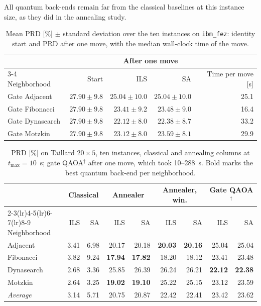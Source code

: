 \documentclass{svproc}
\newcommand{\rev}[1]{{\color{blue}#1}}
\newcommand{\rev}[1]{#1}
\begin{document}
All quantum back-ends remain far from the classical baselines at this instance
size, as they did in the annealing study.

\begin{table}[htb]
\centering
\caption{\rev{Mean PRD [\%] $\pm$ standard deviation over the ten instances on
  \texttt{ibm\_fez}: identity start and PRD after one move, with the median
  wall-clock time of the move.}}
\label{tab:rpd_hw}
\footnotesize
\begin{tabular*}{\textwidth}{@{\extracolsep{\fill}}lrrrr@{}}
\toprule
& & \multicolumn{2}{c}{\rev{After one move}} & \\
\cmidrule(lr){3-4}
\rev{Neighborhood} & \rev{Start} & \rev{ILS} & \rev{SA} & \rev{Time per move [s]} \\
\midrule
\rev{Gate Adjacent}   & \rev{$27.90\pm9.8$} & \rev{$25.04\pm10.0$} & \rev{$25.04\pm10.0$} & \rev{25.1} \\
\rev{Gate Fibonacci}  & \rev{$27.90\pm9.8$} & \rev{$23.41\pm9.2$}  & \rev{$23.48\pm9.0$}  & \rev{16.4} \\
\rev{Gate Dynasearch} & \rev{$27.90\pm9.8$} & \rev{$\mathbf{22.12}\pm8.0$} & \rev{$\mathbf{22.38}\pm8.7$} & \rev{33.2} \\
\rev{Gate Motzkin}    & \rev{$27.90\pm9.8$} & \rev{$23.12\pm8.0$}  & \rev{$23.59\pm8.1$}  & \rev{29.9} \\
\bottomrule
\end{tabular*}
\end{table}


\begin{table}[htb]
\centering
\caption{PRD [\%] on Taillard $20\times5$, ten instances\rev{, classical and
  annealing columns at $t_{\max}=10$~s; gate QAOA$^{\dagger}$ after one move,
  which took 10--288~s}. Bold marks the best quantum back-end per neighborhood.}
\label{tab:cmp}
\footnotesize
\setlength{\tabcolsep}{4pt}
\begin{tabular*}{\textwidth}{@{\extracolsep{\fill}}lrrrrrrrr@{}}
\toprule
& \multicolumn{2}{c}{Classical} & \multicolumn{2}{c}{Annealer}
& \multicolumn{2}{c}{Annealer, win.} & \multicolumn{2}{c}{Gate QAOA\rev{$^{\dagger}$}} \\
\cmidrule(lr){2-3}\cmidrule(lr){4-5}\cmidrule(lr){6-7}\cmidrule(lr){8-9}
Neighborhood & ILS & SA & ILS & SA & ILS & SA & ILS & SA \\
\midrule
Adjacent    & 3.41 & 6.98 & 20.17 & 20.18 & \textbf{20.03} & \textbf{20.16} & 25.04 & 25.04 \\
Fibonacci   & 3.82 & 9.24 & \textbf{17.94} & \textbf{17.82} & 18.20 & 18.12 & 23.41 & 23.48 \\
Dynasearch  & 2.68 & 3.36 & 25.85 & 26.39 & 26.24 & 26.21 & \textbf{22.12} & \textbf{22.38} \\
Motzkin     & 2.64 & 3.25 & \textbf{19.02} & \textbf{19.10} & 25.22 & 25.15 & 23.12 & 23.59 \\
\midrule
\emph{Average} & 3.14 & 5.71 & 20.75 & 20.87 & 22.42 & 22.41 & 23.42 & 23.62 \\
\bottomrule
\end{tabular*}
\end{table}
\end{document}
